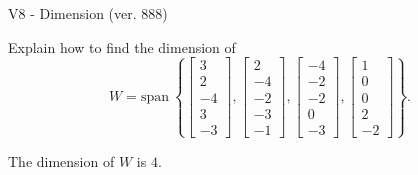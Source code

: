 \begin{exercise}
  \begin{exerciseTitle}V8 - Dimension (ver. 888)\end{exerciseTitle}
  \begin{exerciseStatement}
    Explain how to find the dimension of 
\[W=\mathrm{span}\ \left\{\left[\begin{array}{r}
3 \\
2 \\
-4 \\
3 \\
-3
\end{array}\right] , \left[\begin{array}{r}
2 \\
-4 \\
-2 \\
-3 \\
-1
\end{array}\right] , \left[\begin{array}{r}
-4 \\
-2 \\
-2 \\
0 \\
-3
\end{array}\right] , \left[\begin{array}{r}
1 \\
0 \\
0 \\
2 \\
-2
\end{array}\right]\right\}.\]



  \end{exerciseStatement}
  \begin{exerciseAnswer}
   The dimension of \(W\) is  \(4\).
  


  \end{exerciseAnswer}
\end{exercise}